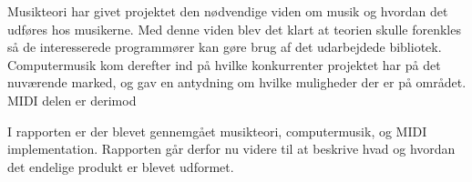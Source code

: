 Musikteori har givet projektet den nødvendige viden om musik og hvordan det udføres hos musikerne.
Med denne viden blev det klart at teorien skulle forenkles så de interesserede programmører kan gøre brug af det udarbejdede bibliotek.
Computermusik kom derefter ind på hvilke konkurrenter projektet har på det nuværende marked, og gav en antydning om hvilke muligheder der er på området.
MIDI delen er derimod  

I rapporten er der blevet gennemgået musikteori, computermusik, og MIDI implementation.
Rapporten går derfor nu videre til at beskrive hvad og hvordan det endelige produkt er blevet udformet.
 